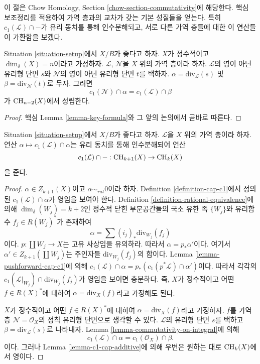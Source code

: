 \noindent
이 절은 Chow Homology, Section \ref{chow-section-commutativity}에
해당한다. 핵심 보조정리를 적용하여 가역 층과의 교차가 갖는
기본 성질들을 얻는다. 특히 $c_1(\mathcal{L}) \cap -$가 유리 동치를
통해 인수분해되고, 서로 다른 가역 층들에 대한 이 연산들이
가환함을 보겠다.

\begin{lemma}
\label{lemma-commutativity-on-integral}
Situation \ref{situation-setup}에서 $X/B$가 좋다고 하자.
$X$가 정수적이고 $\dim_\delta(X) = n$이라고 가정하자.
$\mathcal{L}$, $\mathcal{N}$을 $X$ 위의 가역 층이라 하자.
$\mathcal{L}$의 영이 아닌 유리형 단면 $s$와 $\mathcal{N}$의
영이 아닌 유리형 단면 $t$를 택하자.
$\alpha = \text{div}_\mathcal{L}(s)$ 및
$\beta = \text{div}_\mathcal{N}(t)$로 두자. 그러면
$$
c_1(\mathcal{N}) \cap \alpha
=
c_1(\mathcal{L}) \cap \beta
$$
가 $\mathop{\mathrm{CH}}\nolimits_{n - 2}(X)$에서 성립한다.
\end{lemma}

\begin{proof}
핵심 Lemma \ref{lemma-key-formula}와 그 앞의 논의에서 곧바로 따른다.
\end{proof}

\begin{lemma}
\label{lemma-factors}
Situation \ref{situation-setup}에서 $X/B$가 좋다고 하자.
$\mathcal{L}$을 $X$ 위의 가역 층이라 하자. 연산
$\alpha \mapsto c_1(\mathcal{L}) \cap \alpha$는 유리 동치를 통해
인수분해되어 연산
$$
c_1(\mathcal{L}) \cap - : \mathop{\mathrm{CH}}\nolimits_{k + 1}(X) \to \mathop{\mathrm{CH}}\nolimits_k(X)
$$
을 준다.
\end{lemma}

\begin{proof}
$\alpha \in Z_{k + 1}(X)$이고 $\alpha \sim_{rat} 0$이라 하자.
Definition \ref{definition-cap-c1}에서 정의된
$c_1(\mathcal{L}) \cap \alpha$가 영임을 보여야 한다.
Definition \ref{definition-rational-equivalence}에 의해
$\dim_\delta(W_j) = k + 2$인 정수적 닫힌 부분공간들의 국소 유한 족
$\{W_j\}$와 유리함수 $f_j \in R(W_j)^*$가 존재하여
$$
\alpha = \sum (i_j)_*\text{div}_{W_j}(f_j)
$$
이다. $p : \coprod W_j \to X$는 고유 사상임을 유의하라. 따라서
$\alpha = p_*\alpha'$이다. 여기서
$\alpha' \in Z_{k + 1}(\coprod W_j)$는 주인자들
$\text{div}_{W_j}(f_j)$의 합이다. Lemma
\ref{lemma-pushforward-cap-c1}에 의해
$c_1(\mathcal{L}) \cap \alpha =
p_*(c_1(p^*\mathcal{L}) \cap \alpha')$이다. 따라서 각각의
$c_1(\mathcal{L}|_{W_j}) \cap \text{div}_{W_j}(f_j)$가 영임을
보이면 충분하다. 즉, $X$가 정수적이고 어떤 $f \in R(X)^*$에 대하여
$\alpha = \text{div}_X(f)$라고 가정해도 된다.

\medskip\noindent
$X$가 정수적이고 어떤 $f \in R(X)^*$에 대하여
$\alpha = \text{div}_X(f)$라고 가정하자.
$f$를 가역 층 $\mathcal{N} = \mathcal{O}_X$의 정칙 유리형 단면으로
생각할 수 있다. $\mathcal{L}$의 유리형 단면 $s$를 택하고
$\beta = \text{div}_\mathcal{L}(s)$로 나타내자. Lemma
\ref{lemma-commutativity-on-integral}에 의해
$$
c_1(\mathcal{L}) \cap \alpha = c_1(\mathcal{O}_X) \cap \beta.
$$
이다. 그러나 Lemma \ref{lemma-c1-cap-additive}에 의해 우변은
원하는 대로 $\mathop{\mathrm{CH}}\nolimits_k(X)$에서 영이다.
\end{proof}

